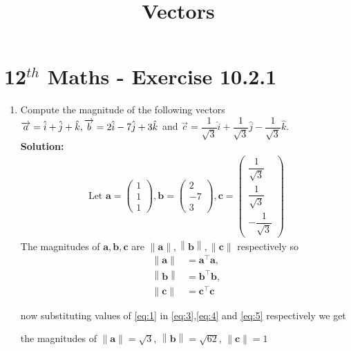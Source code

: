 \documentclass[12pt]{article}
\providecommand{\norm}[1]{\left\lVert#1\right\rVert}
\newcommand{\solution}{\noindent \textbf{Solution: }}
\newcommand{\myvec}[1]{\ensuremath{\begin{pmatrix}#1\end{pmatrix}}}
\let\vec\mathbf
\begin{document}
\begin{center}
\title{\textbf{Vectors}}
\date{\vspace{-5ex}} %
\maketitle
\end{center}
\setcounter{page}{1}
\section*{12$^{th}$ Maths - Exercise 10.2.1}

\begin{enumerate}
\item Compute the magnitude of the following vectors 
$\\ \overrightarrow{a}=\hat{i}+\hat{j}+\hat{k},\overrightarrow{b}=2\hat{i}-7\hat{j}+3\hat{k}$ and $\overrightarrow{c}=\dfrac{1}{\sqrt{3}}\hat{i}+\dfrac{1}{\sqrt{3}}\hat{j}-\dfrac{1}{\sqrt{3}}\hat{k}$.\\
\solution
\begin{align}
\text{Let } \vec{a} = \myvec{1\\1\\1} , \vec{b} = \myvec{2\\ -7 \\ 3},\vec{c} = \myvec{\dfrac{1}{\sqrt{3}}\\ \dfrac{1}{\sqrt{3}} \\ -\dfrac{1}{\sqrt{3}}} 
\label{eq:1}
\end{align}
The magnitudes of $\vec{a},\vec{b},\vec{c}$ are $\norm{\vec{a}},\norm{\vec{b}},\norm{\vec{c}}$ respectively
so
\begin{align}
	\norm{\vec{a}}&={\vec{a}}^{\top}\vec{a}, 
	\label{eq:3}
	\\ \norm{\vec{b}}&={\vec{b}}^{\top}\vec{b}, 
	\label{eq:4}
	\\ \norm{\vec{c}}&={\vec{c}}^{\top}\vec{c}	
	\label{eq:5}
\end{align}

now substituting values of \eqref{eq:1} in \eqref{eq:3},\eqref{eq:4} and \eqref{eq:5} respectively we get

the magnitudes of $\norm{\vec{a}}=\sqrt{3}$, $\norm{\vec{b}}= \sqrt{62}$, $\norm{\vec{c}}=1$

\end{enumerate}
\end{document}
